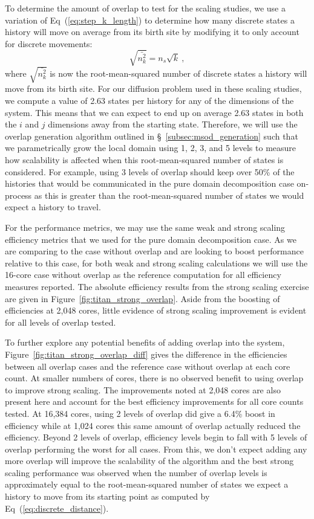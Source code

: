\documentclass{snamc2013}
\begin{document}
To determine the amount of overlap to test for the scaling studies, we
use a variation of Eq~(\ref{eq:step_k_length}) to determine how many
discrete states a history will move on average from its birth site by
modifying it to only account for discrete movements:
\begin{equation}
  \sqrt{\bar{n^2_k}} = n_s \sqrt{k}\:,
  \label{eq:discrete_distance}
\end{equation}
where $\sqrt{\bar{n^2_k}}$ is now the root-mean-squared number of
discrete states a history will move from its birth site. For our
diffusion problem used in these scaling studies, we compute a value of
2.63 states per history for any of the dimensions of the system. This
means that we can expect to end up on average 2.63 states in both the
$i$ and $j$ dimensions away from the starting state. Therefore, we
will use the overlap generation algorithm outlined in
\S~\ref{subsec:msod_generation} such that we parametrically grow the
local domain using 1, 2, 3, and 5 levels to measure how scalability is
affected when this root-mean-squared number of states is
considered. For example, using 3 levels of overlap should keep over
50\% of the histories that would be communicated in the pure domain
decomposition case on-process as this is greater than the
root-mean-squared number of states we would expect a history to
travel.

For the performance metrics, we may use the same weak and strong
scaling efficiency metrics that we used for the pure domain
decomposition case. As we are comparing to the case without overlap
and are looking to boost performance relative to this case, for both
weak and strong scaling calculations we will use the 16-core case
without overlap as the reference computation for all efficiency
measures reported. The absolute efficiency results from the strong
scaling exercise are given in
Figure~\ref{fig:titan_strong_overlap}. Aside from the boosting of
efficiencies at 2,048 cores, little evidence of strong scaling
improvement is evident for all levels of overlap tested. 

To further explore any potential benefits of adding overlap into the
system, Figure~\ref{fig:titan_strong_overlap_diff} gives the
difference in the efficiencies between all overlap cases and the
reference case without overlap at each core count. At smaller numbers
of cores, there is no observed benefit to using overlap to improve
strong scaling. The improvements noted at 2,048 cores are also present
here and account for the best efficiency improvements for all core
counts tested. At 16,384 cores, using 2 levels of overlap did give a
6.4\% boost in efficiency while at 1,024 cores this same amount of
overlap actually reduced the efficiency. Beyond 2 levels of overlap,
efficiency levels begin to fall with 5 levels of overlap performing
the worst for all cases. From this, we don't expect adding any more
overlap will improve the scalability of the algorithm and the best
strong scaling performance was observed when the number of overlap
levels is approximately equal to the root-mean-squared number of
states we expect a history to move from its starting point as computed
by Eq~(\ref{eq:discrete_distance}).
\end{document}
